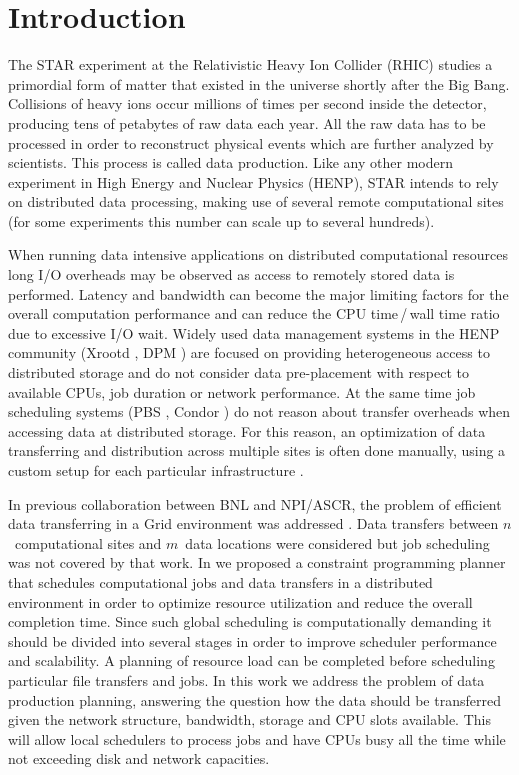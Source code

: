 \documentclass{svjour3}                     %
\begin{document}
\section{Introduction}
\label{intro}
The STAR experiment at the Relativistic Heavy Ion Collider (RHIC) studies a
primordial form of matter that existed in the universe shortly after the Big
Bang. Collisions of heavy ions occur millions of times per second inside the
detector, producing tens of petabytes of raw data each year. All the raw data
has to be processed in order to reconstruct physical events which are
further analyzed by scientists. This process is called data production.  Like
any other modern experiment in High Energy and Nuclear Physics (HENP), STAR intends to rely on
distributed data processing, making use of several remote computational sites
(for some experiments this number can scale up to several hundreds).

When running data intensive applications on distributed computational
resources long I/O overheads may be observed as access to remotely stored data
is performed. Latency and bandwidth can become the major limiting factors for
the overall computation performance and can reduce the CPU time\,/\,wall time 
ratio due to excessive I/O wait. 
Widely used data management systems in the HENP community
(Xrootd \cite{Xrootd}, DPM \cite{DPM}) are focused on providing heterogeneous access to distributed
storage and do not consider data pre-placement with respect to available CPUs,
job duration or network performance. At the same time job scheduling systems
(PBS \cite{PBS}, Condor \cite{Torque}) do not reason about transfer overheads when accessing data at
distributed storage. For this reason, an optimization of data transferring and
distribution across multiple sites is often done manually, using a custom
setup for each particular infrastructure \cite{Balewski}. 

In previous collaboration between BNL and NPI/ASCR, the problem of
efficient data transferring in a Grid environment was addressed \cite{Zerola}.
Data transfers between $n$~computational sites and $m$~data locations were
considered but job scheduling was not covered
by that work. In \cite{ACAT_cp} we
proposed a constraint programming planner that schedules computational jobs
and data transfers in a distributed environment in order to optimize resource
utilization and reduce the overall completion time. Since such global
scheduling is computationally demanding it should be divided into several
stages in order to improve scheduler performance and scalability. A planning of
resource load can be completed before scheduling particular file
transfers and jobs. In this work we address the problem of data production
planning, answering the question how the data should be transferred given the
network structure, bandwidth, storage and CPU slots available. This will allow
local schedulers to process jobs and have CPUs busy all the time while not
exceeding disk and network capacities.
\end{document}

